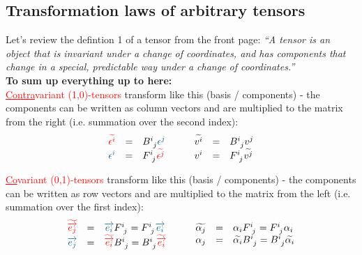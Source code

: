 \subsection{Transformation laws of arbitrary tensors}
Let's review the defintion 1 of a tensor from the front page: \emph{``A tensor is an
object that is invariant under a change of coordinates, and has components that change in
a special, predictable way under a change of coordinates.''} \\

\textbf{To sum up everything up to here:}\\

\textcolor{red}{\underline{Contra}variant (1,0)-tensors} transform like this (basis /
components) - the components can be written as column vectors and are multiplied to the
matrix from the right (i.e. summation over the second index):
\begin{equation}
    \begin{array}{rcl}
        \hdcbtvc{i} & = & B^{i~}_{~j} \hdcbvc{j} \\
        \hdcbvc{i} & = & F^{i~}_{~j}  \hdcbtvc{j}
    \end{array}
    \qquad
    \begin{array}{rcl}
        \hdtvc{i} & = & B^{i~}_{~j} \hdvc{j} \\
        \hdvc{i} & = & F^{i~}_{~j}  \hdtvc{j}
    \end{array}
\end{equation}

\textcolor{red}{\underline{Co}variant (0,1)-tensors} transform like this (basis /
components) - the components can be written as row vectors and are multiplied to the
matrix from the left (i.e. summation over the first index):
\begin{equation}
    \begin{array}{rcl}
        \hdbtv{j} & = & \hdbv{i}  F^{i~}_{~j} = F^{i~}_{~j} \hdbv{i}\\
        \hdbv{j} & = & \hdbtv{i} B^{i~}_{~j} = B^{i~}_{~j} \hdbtv{i}
    \end{array}
    \qquad
    \begin{array}{rcl}
        \widetilde{\alpha_j} & = & \alpha_i F^{i~}_{~j} = F^{i~}_{~j} \alpha_i \\
        {\alpha_j} & = & \widetilde{\alpha_i} B^{i~}_{~j}
        = B^{i~}_{~j} \widetilde{\alpha_i}
    \end{array}
\end{equation}

